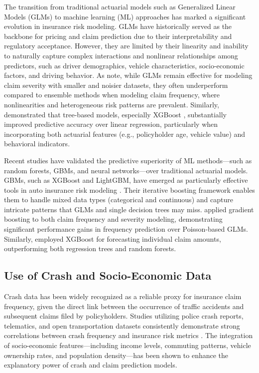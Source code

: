 \documentclass[
  number,
  review,
  3p]{elsarticle}
\begin{document}
The transition from traditional actuarial models such as Generalized
Linear Models (GLMs) to machine learning (ML) approaches has marked a
significant evolution in insurance risk modeling. GLMs have historically
served as the backbone for pricing and claim prediction due to their
interpretability and regulatory acceptance. However, they are limited by
their linearity and inability to naturally capture complex interactions
and nonlinear relationships among predictors, such as driver
demographics, vehicle characteristics, socio-economic factors, and
driving behavior. As \citet{clemente} note, while GLMs remain effective
for modeling claim severity with smaller and noisier datasets, they
often underperform compared to ensemble methods when modeling claim
frequency, where nonlinearities and heterogeneous risk patterns are
prevalent. Similarly, \citet{jonkheijm} demonstrated that tree-based
models, especially XGBoost \citep{xgboost}, substantially improved
predictive accuracy over linear regression, particularly when
incorporating both actuarial features (e.g., policyholder age, vehicle
value) and behavioral indicators.

Recent studies have validated the predictive superiority of ML
methods---such as random forests, GBMs, and neural networks---over
traditional actuarial models. GBMs, such as XGBoost and LightGBM, have
emerged as particularly effective tools in auto insurance risk modeling
\citep{henckaerts}. Their iterative boosting framework enables them to
handle mixed data types (categorical and continuous) and capture
intricate patterns that GLMs and single decision trees may miss.
\citet{clemente} applied gradient boosting to both claim frequency and
severity modeling, demonstrating significant performance gains in
frequency prediction over Poisson-based GLMs. Similarly,
\citet{jonkheijm} employed XGBoost for forecasting individual claim
amounts, outperforming both regression trees and random forests.

\subsection{\texorpdfstring{\textbf{Use of Crash and Socio-Economic
Data}}{Use of Crash and Socio-Economic Data}}\label{use-of-crash-and-socio-economic-data}

Crash data has been widely recognized as a reliable proxy for insurance
claim frequency, given the direct link between the occurrence of traffic
accidents and subsequent claims filed by policyholders. Studies
utilizing police crash reports, telematics, and open transportation
datasets consistently demonstrate strong correlations between crash
frequency and insurance risk metrics \citep{takale}. The integration of
socio-economic features---including income levels, commuting patterns,
vehicle ownership rates, and population density---has been shown to
enhance the explanatory power of crash and claim prediction models.
\end{document}

